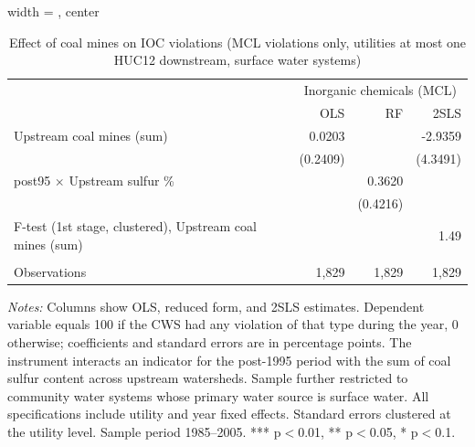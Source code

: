 
\begin{table}[htbp]
   
   \caption{\label{2sls_dwnstrm_minevio_mcl_ivsum_binvio_surfacewater} Effect of coal mines on IOC violations (MCL violations only, utilities at most one HUC12 downstream, surface water systems)}
   \bigskip
   
   \centering
   
   \begin{adjustbox}{width = \textwidth, center}
      
      
      \begin{tabular}{lrrr}
         \toprule
         
          & \multicolumn{3}{c}{Inorganic chemicals (MCL)}\\
         
                                                                  & OLS      & RF       & 2SLS\\  
         
         \midrule 
         Upstream coal mines (sum)                                & 0.0203   &          & -2.9359\\   
                                                                  & (0.2409) &          & (4.3491)\\   
         post95 $\times$ Upstream sulfur \%                       &          & 0.3620   &   \\   
                                                                  &          & (0.4216) &   \\   
         
         F-test (1st stage, clustered), Upstream coal mines (sum) &          &          & 1.49\\  
         
          \\
         
         Observations                                             & 1,829    & 1,829    & 1,829\\  
         
         \bottomrule
         
      \end{tabular}
      
      
      
   \end{adjustbox}
      {\tiny\linespread{1}\selectfont \par \raggedright 
   \textit{Notes:} Columns show OLS, reduced form, and 2SLS estimates. Dependent variable equals 100 if the CWS had any violation of that type during the year, 0 otherwise; coefficients and standard errors are in percentage points. The instrument interacts an indicator for the post-1995 period with the sum of coal sulfur content across upstream watersheds. Sample further restricted to community water systems whose primary water source is surface water. All specifications include utility and year fixed effects. Standard errors clustered at the utility level. Sample period 1985--2005. *** p$<$0.01, ** p$<$0.05, * p$<$0.1.}
   
\end{table}


